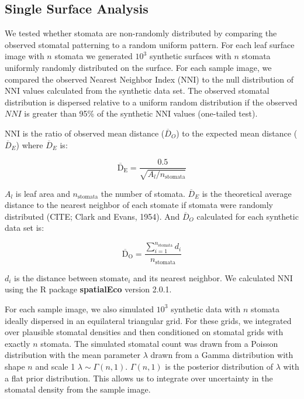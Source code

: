 \documentclass[12pt,halfline,a4paper,]{ouparticle}
\begin{document}
\hypertarget{single-surface-analysis}{%
\subsection{Single Surface Analysis}\label{single-surface-analysis}}

We tested whether stomata are non-randomly distributed by comparing the
observed stomatal patterning to a random uniform pattern. For each leaf
surface image with \(n\) stomata we generated \(10^3\) synthetic
surfaces with \(n\) stomata uniformly randomly distributed on the
surface. For each sample image, we compared the observed Nearest
Neighbor Index (\(\mathrm{NNI}\)) to the null distribution of
\(\mathrm{NNI}\) values calculated from the synthetic data set. The
observed stomatal distribution is dispersed relative to a uniform random
distribution if the observed \(NNI\) is greater than 95\% of the
synthetic \(\mathrm{NNI}\) values (one-tailed test).

\(\mathrm{NNI}\) is the ratio of observed mean distance
(\(\overline{D}_O\)) to the expected mean distance (\(\overline{D}_E\))
where \(\overline{D}_E\) is:

\begin{equation}\label{eq:emd}
  \mathrm{\overline{D}_E} = \frac{0.5}{\sqrt{A_l/n_\text{stomata}}}
\end{equation}

\(A_l\) is leaf area and \(n_\text{stomata}\) the number of stomata.
\(\overline{D}_E\) is the theoretical average distance to the nearest
neighbor of each stomate if stomata were randomly distributed (CITE;
Clark and Evans, 1954). And \(\overline{D}_O\) calculated for each
synthetic data set is:

\begin{equation}\label{eq:omd}
  \mathrm{\overline{D}_O} = \frac{\sum_{i=1}^{n_\text{stomata}}d_i}{n_\text{stomata}}
\end{equation}

\(d_i\) is the distance between \(\text{stomate}_i\) and its nearest
neighbor. We calculated \(\mathrm{NNI}\) using the R package
\textbf{spatialEco} version 2.0.1.

For each sample image, we also simulated \(10^3\) synthetic data with
\(n\) stomata ideally dispersed in an equilateral triangular grid. For
these grids, we integrated over plausible stomatal densities and then
conditioned on stomatal grids with exactly \(n\) stomata. The simulated
stomatal count was drawn from a Poisson distribution with the mean
parameter \(\lambda\) drawn from a Gamma distribution with shape \(n\)
and scale 1 \(\lambda \sim \Gamma(n, 1)\). \(\Gamma(n, 1)\) is the
posterior distribution of \(\lambda\) with a flat prior distribution.
This allows us to integrate over uncertainty in the stomatal density
from the sample image.
\end{document}
